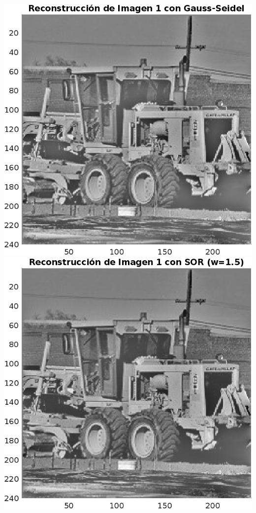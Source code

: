 \begin{homeworkProblem}
\begin{solucion}
\begin{center}
      \includegraphics[scale=0.6]{Figures/Figure_1GS.png}
      \includegraphics[scale=0.6]{Figures/Figure_1SOR.png}

\end{center}
\end{solucion}
\end{homeworkProblem}
